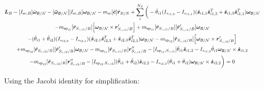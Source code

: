 \documentclass[paper]{aiaaNew}
\begin{document}
\begin{multline}
\bm L_B -[I_{\text{sc},B}] \dot{\bm\omega}_{\cal B/N} -[\bm{\tilde{\omega}}_{\cal B/N}] [I_{\text{sc},B}] \bm\omega_{\cal B/N} 
- m_{\text{sc}} [\tilde{\bm c}] \ddot{\bm r}_{B/N} 
+ \sum\limits_{i}^{N_S}\bigg( -\dot{\theta}_{i1} (I_{s_{i1,3}} - I_{s_{i1,1}})( \hat{\bm s}_{i1,1} \hat{\bm s}_{i1,3}^T + \hat{\bm s}_{i1,3} \hat{\bm s}_{i1,1}^T) \bm \omega_{\cal{B/N}} \\
- m_{\text{sp}_{i1}} [\tilde{{\bm r}}_{S_{c,i1}/B}] \Big[\bm\omega_{\cal B/N} \times \bm{r}'_{S_{c,i1}/B}\Big] + m_{\text{sp}_{i1}} [\tilde{{\bm r}}_{S_{c,i1}/B}] [\tilde{{\bm r}}'_{S_{c,i1}/B}] \bm\omega_{\cal B/N} \\
-(\dot{\theta}_{i1}  + \dot{\theta}_{i2})(I_{s_{i2,3}} - I_{s_{i2,1}}) (\hat{\bm s}_{i2,1} \hat{\bm s}_{i2,3}^T + \hat{\bm s}_{i2,3} \hat{\bm s}_{i2,1}^T) \bm \omega_{\cal{B/N}} 
- m_{\text{sp}_{i2}} [\tilde{{\bm r}}_{S_{c,i2}/B}] \Big[ \bm\omega_{\cal B/N} \times \bm{r}'_{S_{c,i2}/B}\Big]\\
+  m_{\text{sp}_{i2}} [\tilde{{\bm r}}_{S_{c,i2}/B}] [\tilde{{\bm r}}'_{S_{c,i2}/B}] \bm\omega_{\cal B/N}
- m_{\text{sp}_{i1}} [\tilde{{\bm r}}_{S_{c,i1}/B}] \bm{r}''_{S_{c,i1}/B} 
-[I_{\text{sp}_{i1},S_{c,i1}}] \ddot{\theta}_{i1} \hat{\bm s}_{i1,2} 
-I_{s_{i1,2}} \dot{\theta}_{i1} \bm \omega_{\cal{B/N}} \times \hat{\bm s}_{i1,2}
\\
- m_{\text{sp}_{i2}} [\tilde{{\bm r}}_{S_{c,i2}/B}] \bm{r}''_{S_{c,i2}/B}
-[I_{\text{sp}_{i2},S_{c,i2}}] (\ddot{\theta}_{i1}  + \ddot{\theta}_{i2})\hat{\bm s}_{i2,2} 
-I_{s_{i2,2}}  (\dot{\theta}_{i1}  + \dot{\theta}_{i2}) \bm \omega_{\cal{B/N}} \times \hat{\bm s}_{i2,2} \bigg) = 0
\end{multline}

Using the Jacobi identity for simplification:
\end{document}
